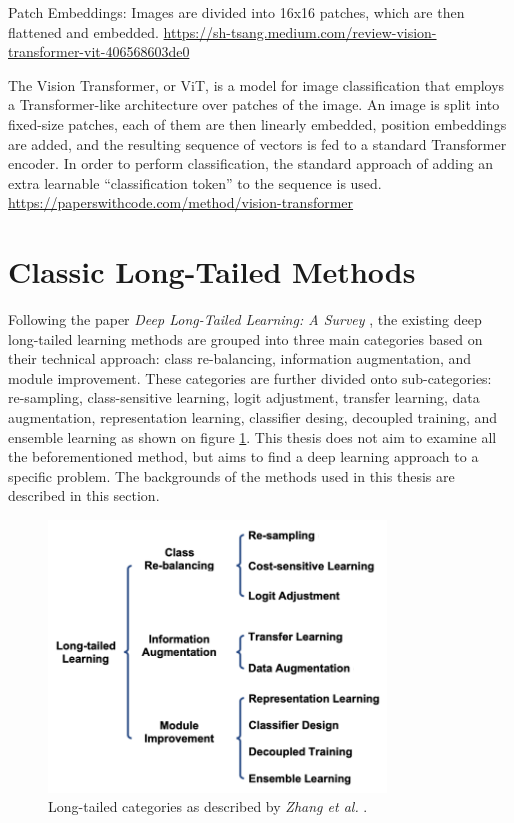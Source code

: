 Patch Embeddings: Images are divided into 16x16 patches, which are then flattened and embedded.
\url{https://sh-tsang.medium.com/review-vision-transformer-vit-406568603de0}

The Vision Transformer, or ViT, is a model for image classification that employs a Transformer-like architecture over patches of the image. An image is split into fixed-size patches, each of them are then linearly embedded, position embeddings are added, and the resulting sequence of vectors is fed to a standard Transformer encoder. In order to perform classification, the standard approach of adding an extra learnable “classification token” to the sequence is used.
\url{https://paperswithcode.com/method/vision-transformer}


\section{Classic Long-Tailed Methods}
\label{sec:lt_methods}

Following the paper \textit{Deep Long-Tailed Learning: A Survey} \cite{zhang2023deep}, the existing deep long-tailed learning methods are grouped into three main categories based on their technical approach: class re-balancing, information augmentation, and module improvement. These categories are further divided onto sub-categories: re-sampling, class-sensitive learning, logit adjustment, transfer learning, data augmentation, representation learning, classifier desing, decoupled training, and ensemble learning as shown on figure \ref{fig:lt_main_categories}. This thesis does not aim to examine all the beforementioned method, but aims to find a deep learning approach to a specific problem. The backgrounds of the methods used in this thesis are described in this section.

\begin{figure}[ht]
    \centering
    \includegraphics[width=0.8\textwidth]{Images/lt_methods_categories.png} 
    \caption{Long-tailed categories as described by \textit{Zhang et al.} \cite{zhang2023deep}.}
    \label{fig:lt_main_categories} %
\end{figure}

